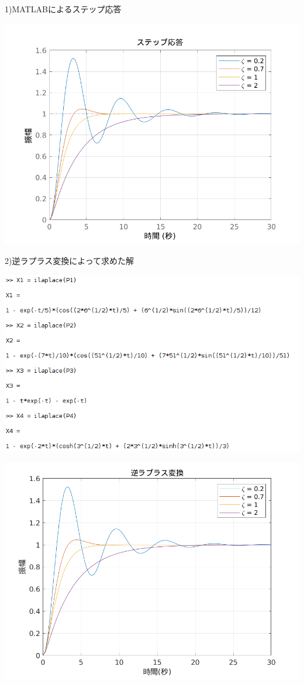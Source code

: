 \documentclass[dvipdfmx, twocolumn]{jsarticle}
\begin{document}
1)MATLABによるステップ応答

\includegraphics[scale = 0.5]{3(1).png}


2)逆ラプラス変換によって求めた解

\includegraphics[scale=0.3]{Sc.png}

\includegraphics[scale = 0.5]{3(2).png}
\end{document}
